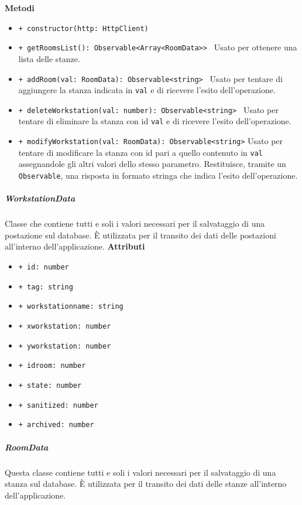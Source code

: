 \textbf{Metodi}
\begin{itemize}
	\item \texttt{+ constructor(http: HttpClient) 	}
	\item \texttt{+ getRoomsList(): Observable<Array<RoomData>> 	} \newline
	Usato per ottenere una lista delle stanze.
	\item \texttt{+ addRoom(val: RoomData): Observable<string> 	} \newline
	Usato per tentare di aggiungere la stanza indicata in \texttt{val} e di ricevere l'esito dell'operazione.
	\item \texttt{+ deleteWorkstation(val: number): Observable<string> 	} \newline
	Usato per tentare di eliminare la stanza con id \texttt{val} e di ricevere l'esito dell'operazione.
	\item \texttt{+ modifyWorkstation(val: RoomData): Observable<string>} \newline
	Usato per tentare di modificare la stanza con id pari a quello contenuto in \texttt{val} assegnandole gli altri valori dello stesso parametro. Restituisce, tramite un \texttt{Observable}, una risposta in formato stringa che indica l'esito dell'operazione.
\end{itemize}
\subparagraph{WorkstationData}
Classe che contiene tutti e soli i valori necessari per il salvataggio di una postazione sul database. È utilizzata per il transito dei dati delle postazioni all'interno dell'applicazione. \newline
\textbf{Attributi}
\begin{itemize}
	\item \texttt{+ id: number 	}
	\item \texttt{+ tag: string 	}
	\item \texttt{+ workstationname: string 	}
	\item \texttt{+ xworkstation: number 	}
	\item \texttt{+ yworkstation: number 	}
	\item \texttt{+ idroom: number 	}
	\item \texttt{+ state: number 	}
	\item \texttt{+ sanitized: number 	}
	\item \texttt{+ archived: number}
\end{itemize}
\subparagraph{RoomData}
Questa classe contiene tutti e soli i valori necessari per il salvataggio di una stanza sul database. È utilizzata per il transito dei dati delle stanze all'interno dell'applicazione. \newline
